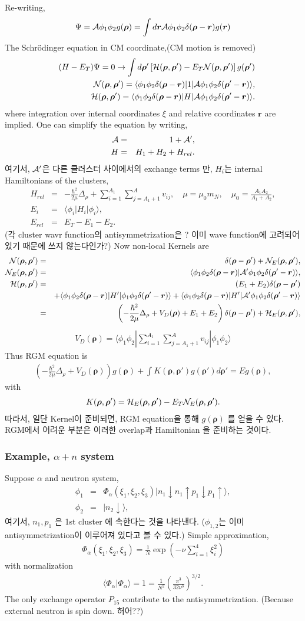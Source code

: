 \documentclass[11pt]{article}
\def\bm{\boldsymbol}
\newcommand{\bea}{\begin{eqnarray}}
\newcommand{\eea}{\end{eqnarray}}
\newcommand{\no}{\nonumber \\}
\newcommand{\vrho}{{\bm \rho}}
\newcommand{\vr}{{\bm r}}
\newcommand{\la}{\langle}
\newcommand{\ra}{\rangle}
\begin{document}
Re-writing,
\bea 
\Psi={\cal A}\phi_1\phi_2 g(\vrho)
    =\int d\vr {\cal A}\phi_1\phi_2 \delta(\vrho-\vr)g(\vr)  
\eea 
The Schr\"odinger equation in CM coordinate,(CM motion is removed) 
\bea 
& & (H - E_{T})\Psi =0
 \to \int d\vrho' \left[ {\cal H}(\vrho,\vrho')
  -E_T {\cal N}(\vrho,\vrho') \right]g(\vrho') \no 
& & {\cal N}(\vrho,\vrho')
    =\la \phi_1 \phi_2 \delta(\vrho-\vr)| 1| {\cal A}   \phi_1 \phi_2 \delta(\vrho'-\vr)\ra ,\no 
& & {\cal H}(\vrho,\vrho')
=\la \phi_1 \phi_2 \delta(\vrho-\vr)| H | {\cal A}   \phi_1 \phi_2 \delta(\vrho'-\vr)\ra .  
\eea 
where integration over internal coordinates $\xi$ 
and relative coordinates $\vr$ are implied. 
One can simplify the equation by writing,
\bea 
{\cal A}&=& 1+{\cal A}' ,\no 
H&=& H_1+H_2+H_{rel}.
\eea 
여기서, ${\cal A}'$은 다른 클러스터 사이에서의 exchange terms 만,
$H_i$는 internal Hamiltonians of the clusters,
\bea 
H_{rel}&=&-\frac{\hbar^2}{2\mu}\Delta_\rho
   +\sum_{i=1}^{A_1}\sum_{j=A_1+1}^{A} v_{ij},
   \quad \mu=\mu_0 m_N, \quad \mu_0=\frac{A_1A_2}{A_1+A_2},\no 
E_i&=&   \la \phi_i|H_i|\phi_i\ra,\no 
E_{rel}&=&E_T-E_1-E_2.
\eea 
(각 cluster wavr function의 antisymmetrization은 ?
이미 wave function에 고려되어 있기 때문에 쓰지 않는다인가?)
Now non-local Kernels are
\bea 
{\cal N}(\vrho,\vrho')
&=&\delta(\vrho-\vrho')+{\cal N}_E(\vrho,\vrho'),\no 
{\cal N}_E(\vrho,\vrho')
&=& \la \phi_1\phi_2\delta(\vrho-\vr)|{\cal A}'\phi_1\phi_2\delta(\vrho'-\vr)\ra, \no 
{\cal H}(\vrho,\vrho')
&=& (E_1+E_2)\delta(\vrho-\vrho') \no & &
+\la \phi_1\phi_2 \delta(\vrho-\vr)|H'|\phi_1\phi_2 \delta(\vrho'-\vr)\ra 
+\la \phi_1\phi_2 \delta(\vrho-\vr)|H'|{\cal A}'\phi_1\phi_2 \delta(\vrho'-\vr)\ra \no 
&=&
\left(-\frac{\hbar^2}{2\mu}\Delta_\rho+ V_D(\vrho) 
   +E_1+E_2\right) \delta(\vrho-\vrho')
   +{\cal H}_{E}(\vrho,\vrho'),
\eea 
\bea 
V_D(\vrho)=\la \phi_1 \phi_2|\sum_{i=1}^{A_1}\sum_{j=A_1+1}^{A}
                 v_{ij}|\phi_1 \phi_2\ra 
\eea 
Thus RGM equation is 
\bea 
\left(-\frac{\hbar^2}{2\mu}\Delta_\rho+ V_D(\vrho) \right)g(\vrho)
+\int K(\vrho,\vrho')g(\vrho') d\vrho'
= E g(\vrho),
\eea 
with 
\bea 
K(\vrho,\vrho')={\cal H}_{E}(\vrho,\vrho')-E_T {\cal N}_{E}(\vrho,\vrho').
\eea 
따라서, 일단 Kernel이 준비되면, RGM equation을 통해 
$g(\vrho)$ 를 얻을 수 있다. 
RGM에서 어려운 부분은 이러한 overlap과 Hamiltonian
을 준비하는 것이다.

\subsubsection{Example, $\alpha+n$ system}
Suppose $\alpha$ and neutron system,
\bea 
\phi_1&=&\Phi_\alpha(\xi_1,\xi_2,\xi_3)|n_1\downarrow n_1\uparrow
  p_1 \downarrow p_1 \uparrow\ra ,\no 
\phi_2&=&|n_2 \downarrow  \ra, 
\eea 
여기서, $n_1,p_1$ 은 1st cluster 에 속한다는 것을 나타낸다. 
($\phi_{1,2}$는 이미 antisymmetrization이 이루어져 있다고 볼 수 있다.)
Simple approximation,
\bea 
\Phi_\alpha(\xi_1,\xi_2,\xi_3)
 =\frac{1}{N}\exp(-\nu \sum_{i=1}^4 \xi_i^2)
\eea  
with normalization 
\bea 
\la \Phi_\alpha|\Phi_\alpha\ra 
=1=\frac{1}{N^2}(\frac{\pi^3}{32\nu^3})^{3/2}.
\eea 
The only exchange operator $P_{15}$ 
contribute to the antisymmetrization. 
(Because external neutron is spin down. 허어??)
\end{document}
